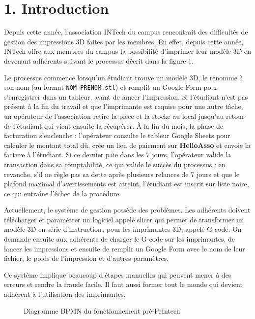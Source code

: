 \newpage

\hypertarget{introduction}{%
\section{1. Introduction}\label{introduction}}

Depuis cette année, l'association INTech du campus rencontrait des
difficultés de gestion des impressions 3D faites par les membres. En
effet, depuis cette année, INTech offre aux membres du campus la
possibilité d'imprimer leur modèle 3D en devenant adhérents suivant le
processus décrit dans la figure 1.

Le processus commence lorsqu'un étudiant trouve un modèle 3D, le renomme
à son nom (au format \texttt{NOM-PRENOM.stl}) et remplit un Google Form
pour s'enregistrer dans un tableur, avant de lancer l'impression. Si
l'étudiant n'est pas présent à la fin du travail et que l'imprimante est
requise pour une autre tâche, un opérateur de l'association retire la
pièce et la stocke au local jusqu'au retour de l'étudiant qui vient
ensuite la récupérer. À la fin du mois, la phase de facturation
s'enclenche : l'opérateur consulte le tableur Google Sheets pour
calculer le montant total dû, crée un lien de paiement sur
\textbf{HelloAsso} et envoie la facture à l'étudiant. Si ce dernier paie
dans les 7 jours, l'opérateur valide la transaction dans sa
comptabilité, ce qui valide le succès du processus ; en revanche, s'il
ne règle pas sa dette après plusieurs relances de 7 jours et que le
plafond maximal d'avertissements est atteint, l'étudiant est inscrit sur
liste noire, ce qui entraîne l'échec de la procédure.

Actuellement, le système de gestion possède des problèmes. Les adhérents
doivent télécharger et paramétrer un logiciel appelé slicer qui permet
de transformer un modèle 3D en série d'instructions pour les imprimantes
3D, appelé G-code. On demande ensuite aux adhérents de charger le G-code
sur les imprimantes, de lancer les impressions et ensuite de remplir un
Google Form avec le nom de leur fichier, le poids de l'impression et
d'autres paramètres.

Ce système implique beaucoup d'étapes manuelles qui peuvent mener à des
erreurs et rendre la fraude facile. Il faut aussi former tout le monde
qui devient adhérent à l'utilisation des imprimantes.

\begin{figure}
\centering

\caption{Diagramme BPMN du fonctionnement pré-PrIntech}
\end{figure}

